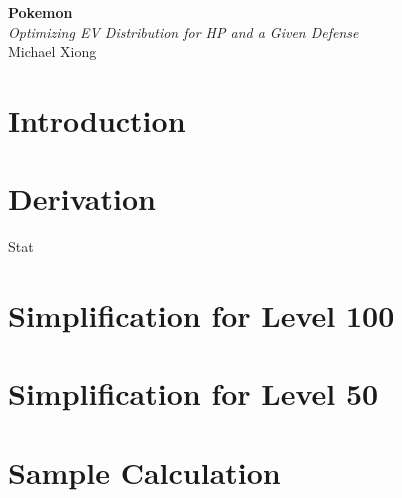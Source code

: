 

\begin{titlepage}
    \sffamily
    \begin{center}
        \Huge
        {\textbf{\color{clrsec}Pokemon\\}}
        \vspace{0.5cm}
        \huge
        {\textit{\color{clrssec}
            Optimizing EV Distribution for HP and a Given Defense\\
        }}
        \vspace{1.5cm}
        {\color{clrsssec}Michael Xiong}
    \end{center}
\end{titlepage}

\section{Introduction}
\section{Derivation}
Stat \cite{BulbStat} \cite{BulbDmg}
\section{Simplification for Level 100}
\section{Simplification for Level 50}
\section{Sample Calculation}
\printbibliography


